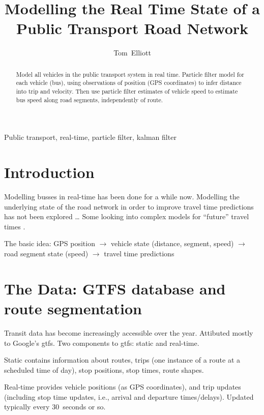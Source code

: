 \documentclass[draftcls,a4paper,onecolumn]{IEEEtran}\usepackage[]{graphicx}\usepackage[]{color}
\title{Modelling the Real Time State of a Public Transport Road Network}
\author{Tom~Elliott}
\begin{document}
\maketitle


\begin{abstract}
  Model all vehicles in the public transport system in real time.
  Particle filter model for each vehicle (bus),
  using observations of position (GPS coordinates) to infer distance into trip
  and velocity.
  Then use particle filter estimates of vehicle speed to estimate bus speed along
  road segments, independently of route.
  
\end{abstract}



\begin{IEEEkeywords}
  Public transport, real-time, particle filter, kalman filter
\end{IEEEkeywords}

\section{Introduction}
\label{sec:intro}


Modelling busses in real-time has been done for a while now.
Modelling the underlying state of the road network in order to improve 
travel time predictions has not been explored \ldots
Some looking into complex models for ``future'' travel times \cite{Julio2016}.


The basic idea:
GPS position $\rightarrow$ 
vehicle state (distance, segment, speed) $\rightarrow$
road segment state (speed) $\rightarrow$
travel time predictions



\section{The Data: GTFS database and route segmentation}
\label{sec:data}

Transit data has become increasingly accessible over the year.
Attibuted mostly to Google's \gls{gtfs}.
Two components to \gls{gtfs}: static and real-time.

Static contains information about routes, trips (one instance of a route at a scheduled time of day),
stop positions, stop times, route shapes.

Real-time provides vehicle positions (as GPS coordinates),
and trip updates (including stop time updates, i.e., arrival and departure times/delays).
Updated typically every 30~seconds or so.
\end{document}
